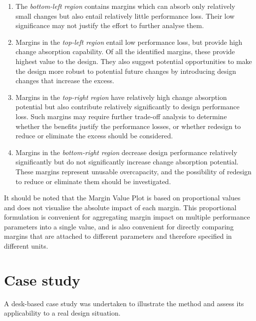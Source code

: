 \begin{enumerate}

\item The \emph{bottom-left region} contains margins which can absorb only relatively small changes but also entail relatively little performance loss. Their low significance may not justify the effort to further analyse them.

\item Margins in the \emph{top-left region} entail low performance loss, but provide high change absorption capability. Of all the identified margins, these provide highest value to the design. They also suggest potential opportunities to make the design more robust to potential future changes by introducing design changes that increase the excess.
 	
\item Margins in the \emph{top-right region} have relatively high change absorption potential but also contribute relatively significantly to design performance loss. Such margins may require further trade-off analysis to determine whether the benefits justify the performance losses, or whether redesign to reduce or eliminate the excess should be considered.

\item Margins in the \emph{bottom-right region} decrease design performance relatively significantly but do not significantly increase change absorption potential. These margins represent unusable overcapacity, and the possibility of redesign to reduce or eliminate them should be investigated.
\end{enumerate}

It should be noted that the Margin Value Plot is based on proportional values and does not visualise the absolute impact of each margin. This proportional formulation is convenient for aggregating margin impact on multiple performance parameters into a single value, and is also convenient for directly comparing margins that are attached to different parameters and therefore specified in different units.

\section{Case study}\label{casestudy}

A desk-based case study was undertaken to illustrate the method and assess its applicability to a real design situation. 

